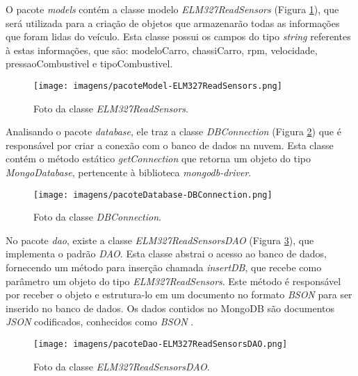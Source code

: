 O pacote \textit{models} contém a classe modelo \textit{ELM327ReadSensors} (Figura \ref{Fig:elm327_read_sensors}), que será utilizada para a criação de objetos que armazenarão todas as informações que foram lidas do veículo. Esta classe possui os campos do tipo \textit{string} referentes à estas informações, que são: modeloCarro, chassiCarro, rpm, velocidade, pressaoCombustivel e tipoCombustivel.

\begin{figure}[!ht]
\centering
\caption{Foto da classe \textit{ELM327ReadSensors}.} 
{\texttt{[image: imagens/pacoteModel-ELM327ReadSensors.png]}}\\
 \label{Fig:elm327_read_sensors}
\end{figure}

Analisando o pacote \textit{database}, ele traz a classe \textit{DBConnection} (Figura \ref{Fig:db_connection}) que é responsável por criar a conexão com o banco de dados na nuvem. Esta classe contém o método estático \textit{getConnection} que retorna um objeto do tipo \textit{MongoDatabase}, pertencente à biblioteca \textit{mongodb-driver}.

\begin{figure}[!ht]
\centering
\caption{Foto da classe \textit{DBConnection}.} 
{\texttt{[image: imagens/pacoteDatabase-DBConnection.png]}}\\
 \label{Fig:db_connection}
\end{figure}

No pacote \textit{dao}, existe a classe \textit{ELM327ReadSensorsDAO} (Figura \ref{Fig:elm327_read_sensors_dao}), que implementa o padrão \textit{DAO}. Esta classe abstrai o acesso ao banco de dados, fornecendo um método para inserção chamada \textit{insertDB}, que recebe como parâmetro um objeto do tipo \textit{ELM327ReadSensors}. Este método é responsável por receber o objeto e estrutura-lo em um documento no formato \textit{BSON} para ser inserido no banco de dados. Os dados contidos no MongoDB são documentos \textit{JSON} codificados, conhecidos como \textit{BSON} \cite{mongodbjsonbson}.

\begin{figure}[!ht]
\centering
\caption{Foto da classe \textit{ELM327ReadSensorsDAO}.} 
{\texttt{[image: imagens/pacoteDao-ELM327ReadSensorsDAO.png]}}\\
 \label{Fig:elm327_read_sensors_dao}
\end{figure}

